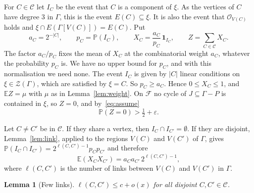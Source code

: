 \documentclass[11pt]{article}
\newtheorem{lemma}[theorem]{Lemma}
\theoremstyle{definition}
\theoremstyle{remark}
\newcommand{\Z}{\mathcal{Z}}
\newcommand{\PP}{\mathbb{P}}
\newcommand{\EE}{\mathbb{E}}
\newcommand{\cO}{\mathcal{O}}
\numberwithin{equation}{section}
\begin{document}
For $C\in\mathcal{C}$ let $I_C$ be the event that $C$ is a component of $\xi$. As the vertices of
$C$ have degree $3$ in $\Gamma$, this is the event $E(C)\subseteq\xi$. It is also the event that
$\cO_{V(C)}$ holds and $\xi\cap E(\Gamma[V(C)])=E(C)$. Put
\[
  a_C=2^{-|C|},\qquad p_C=\PP(I_C),\qquad X_C=\frac{a_C}{p_C}\,\mathbf{1}_{I_C},\qquad
  Z=\sum_{C\in\mathcal{C}}X_C .
\]
The factor $a_C/p_C$ fixes the mean of $X_C$ at the combinatorial weight $a_C$, whatever the
probability $p_C$ is. We have no upper bound for $p_C$, and with this normalisation we need none.
The event $I_C$ is given by
$|C|$ linear conditions on $\xi\in\Z(\Gamma)$, which are satisfied by $\xi=C$. So $p_C\ge a_C$.
Hence $0\le X_C\le1$, and $\EE Z=\mu$ with $\mu$ as in Lemma~\ref{lem:weight}. On $\mathcal{F}$
no cycle of $J\subseteq\Gamma-P$ is contained in $\xi$, so $Z=0$, and by~\eqref{eq:assume}
\begin{equation}\label{eq:Zzero}
  \PP(Z=0)>\tfrac12+\varepsilon .
\end{equation}

Let $C\ne C'$ be in $\mathcal{C}$. If they share a vertex, then $I_C\cap I_{C'}=\emptyset$. If they
are disjoint, Lemma~\ref{lem:link}, applied to the regions $V(C)$ and $V(C')$ of $\Gamma$, gives
$\PP(I_C\cap I_{C'})=2^{\ell(C,C')-1}p_Cp_{C'}$ and therefore
\begin{equation}\label{eq:pair}
  \EE(X_CX_{C'})=a_Ca_{C'}\,2^{\ell(C,C')-1},
\end{equation}
where $\ell(C,C')$ is the number of links between $V(C)$ and $V(C')$ in $\Gamma$.

\begin{lemma}[Few links]\label{lem:links}
$\ell(C,C')\le c+o(x)$ for all disjoint $C,C'\in\mathcal{C}$.
\end{lemma}
\end{document}
